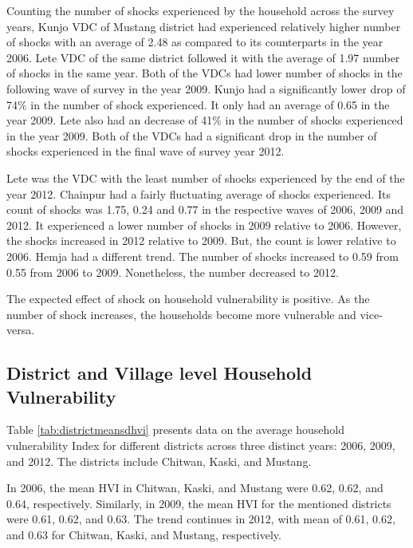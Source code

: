 Counting the number of shocks experienced by the household across the survey years, Kunjo VDC of Mustang district had experienced relatively higher number of shocks with an average of 2.48 as compared to its counterparts in the year 2006. Lete VDC of the same district followed it with the average of 1.97 number of shocks in the same year. Both of the VDCs had lower number of shocks in the following wave of survey in the year 2009. Kunjo had a significantly lower drop of 74\% in the number of shock experienced. It only had an average of 0.65 in the year 2009. Lete also had an decrease of 41\% in the number of shocks experienced in the year 2009. Both of the VDCs had a significant drop in the number of shocks experienced in the final wave of survey year 2012.\par 

Lete was the VDC with the least number of shocks experienced by the end of the year 2012. Chainpur  had a fairly fluctuating average of shocks experienced. Its count of shocks was 1.75, 0.24 and 0.77 in the respective waves of 2006, 2009 and 2012. It experienced a lower number of shocks in 2009 relative to 2006. However, the shocks increased in 2012 relative to 2009. But, the count is lower relative to 2006. Hemja had a different trend. The number of shocks increased to 0.59 from 0.55 from 2006 to 2009. Nonetheless, the number decreased to 2012.\par 

The expected effect of shock on household vulnerability is positive. As the number of shock increases, the households become more vulnerable and vice-versa.


\subsection{District and Village level Household Vulnerability}
Table \ref{tab:districtmeansdhvi} presents data on the average household vulnerability Index for different districts across three distinct years: 2006, 2009, and 2012. The districts include Chitwan, Kaski, and Mustang.

In 2006, the mean HVI in Chitwan, Kaski, and Mustang were 0.62, 0.62, and 0.64, respectively. Similarly, in 2009, the mean HVI for the mentioned districts were 0.61, 0.62, and 0.63. The trend continues in 2012, with mean of 0.61, 0.62, and 0.63 for Chitwan, Kaski, and Mustang, respectively.

